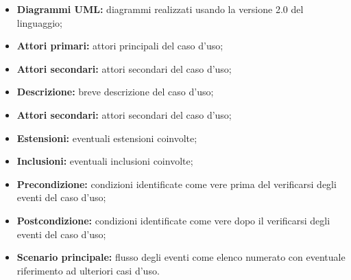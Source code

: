 					\begin{itemize}
						\item \textbf{Diagrammi UML:} diagrammi realizzati usando la versione 2.0 del linguaggio;
						\item \textbf{Attori primari:} attori principali del caso d’uso; 
						\item \textbf{Attori secondari:} attori secondari del caso d’uso;
						\item \textbf{Descrizione:} breve descrizione del caso d'uso;
						\item \textbf{Attori secondari:} attori secondari del caso d’uso;
						\item \textbf{Estensioni:} eventuali estensioni coinvolte;
						\item \textbf{Inclusioni:} eventuali inclusioni coinvolte;
						\item \textbf{Precondizione:} condizioni identificate come vere prima del verificarsi degli eventi del caso d’uso;
						\item \textbf{Postcondizione:} condizioni identificate come vere dopo il verificarsi degli eventi del caso d’uso;
						\item \textbf{Scenario principale:} flusso degli eventi come elenco numerato con eventuale riferimento ad ulteriori casi d’uso.
					\end{itemize}
				
